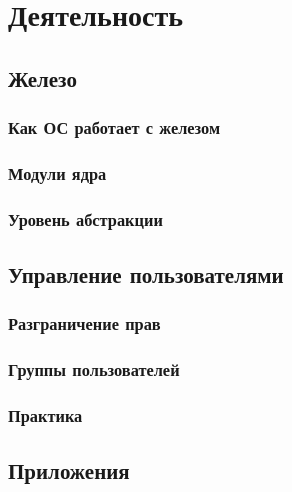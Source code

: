 \section{Деятельность}\label{base:os:activities}
\subsection{Железо}\label{base:os:activities:hardware}
\subsubsection{Как ОС работает с железом}\label{base:os:activities:hardware:how}
\subsubsection{Модули ядра}\label{base:os:activities:hardware:modules}
\subsubsection{Уровень абстракции}\label{base:os:activities:hardware:abstraction}
\subsection{Управление пользователями}\label{base:os:activities:users}
\subsubsection{Разграничение прав}\label{base:os:activities:users:permissions}
\subsubsection{Группы пользователей}\label{base:os:activities:users:groups}
\subsubsection{Практика}\label{base:os:activities:users:practice}
\subsection{Приложения}\label{base:os:activities:apps}